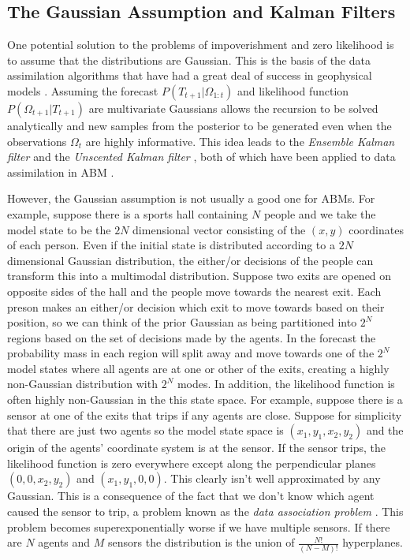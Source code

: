 \documentclass{article}
\begin{document}
\subsection{The Gaussian Assumption and Kalman Filters}

One potential solution to the problems of impoverishment and zero likelihood is to assume that the distributions are Gaussian. This is the basis of the data assimilation algorithms that have had a great deal of success in geophysical models \citep*{carrassi2018data, talagrand_assimilation_1997, kalnay_atmospheric_2003, lewis_dynamic_2006}. Assuming the forecast $P(T_{t+1}|\Omega_{1:t})$ and likelihood function $P(\Omega_{t+1}|T_{t+1})$ are multivariate Gaussians allows the recursion to be solved analytically and new samples from the posterior to be generated even when the observations $\Omega_t$ are highly informative. This idea leads to the \textit{Ensemble Kalman filter} \citep{evensen2003ensemble} and the \textit{Unscented Kalman filter} \citep{wan2001unscented}, both of which have been applied to data assimilation in ABM \citep*{ward_dynamic_2016, clay_realtime_2020}.

However, the Gaussian assumption is not usually a good one for ABMs. For example, suppose there is a sports hall containing $N$ people and we take the model state to be the $2N$ dimensional vector consisting of the $(x,y)$ coordinates of each person. Even if the initial state is distributed according to a $2N$ dimensional Gaussian distribution, the either/or decisions of the people can transform this into a multimodal distribution. Suppose two exits are opened on opposite sides of the hall and the people move towards the nearest exit. Each preson makes an either/or decision which exit to move towards based on their position, so we can think of the prior Gaussian as being partitioned into $2^N$ regions based on the set of decisions made by the agents. In the forecast the probability mass in each region will split away and move towards one of the $2^N$ model states where all agents are at one or other of the exits, creating a highly non-Gaussian distribution with $2^N$ modes. In addition, the likelihood function is often highly non-Gaussian in the this state space. For example, suppose there is a sensor at one of the exits that trips if any agents are close. Suppose for simplicity that there are just two agents so the model state space is $(x_1,y_1,x_2,y_2)$ and the origin of the agents' coordinate system is at the sensor. If the sensor trips, the likelihood function is zero everywhere except along the perpendicular planes $(0,0,x_2,y_2)$ and $(x_1,y_1,0,0)$. This clearly isn't well approximated by any Gaussian. This is a consequence of the fact that we don't know which agent caused the sensor to trip, a problem known as the \textit{data association problem} \citep{lueck_who_2019}. This problem becomes superexponentially worse if we have multiple sensors. If there are $N$ agents and $M$ sensors the distribution is the union of $\frac{N!}{(N-M)!}$ hyperplanes.
\end{document}
